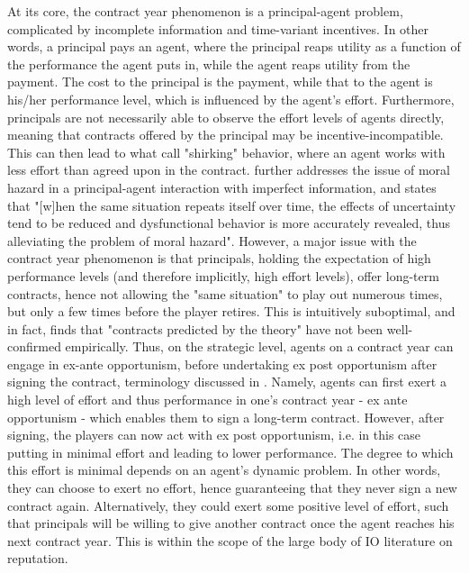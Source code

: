 \documentclass[12pt]{article}
\begin{document}
	At its core, the contract year phenomenon is a principal-agent problem, complicated by incomplete information and time-variant incentives. In other words, a principal pays an agent, where the principal reaps utility as a function of the performance the agent puts in, while the agent reaps utility from the payment. The cost to the principal is the payment, while that to the agent is his/her performance level, which is influenced by the agent's effort. Furthermore, principals are not necessarily able to observe the effort levels of agents directly, meaning that contracts offered by the principal may be incentive-incompatible. This can then lead to what \cite{alchian_1972} call "shirking" behavior, where an agent works with less effort than agreed upon in the contract. \cite{holmstrom_contracts_1999} further addresses the issue of moral hazard in a principal-agent interaction with imperfect information, and states that "[w]hen the same situation repeats itself over time, the effects of uncertainty tend to be reduced and dysfunctional behavior is more accurately revealed, thus alleviating the problem of moral hazard". However, a major issue with the contract year phenomenon is that principals, holding the expectation of high performance levels (and therefore implicitly, high effort levels), offer long-term contracts, hence not allowing the "same situation" to play out numerous times, but only a few times before the player retires. This is intuitively suboptimal, and in fact, \cite{prendergast_1999} finds that "contracts predicted by the theory" have not been well-confirmed empirically. Thus, on the strategic level, agents on a contract year can engage in ex-ante opportunism, before undertaking ex post opportunism after signing the contract, terminology discussed in \cite{ress_1994}. Namely, agents can first exert a high level of effort and thus performance in one's contract year - ex ante opportunism - which enables them to sign a long-term contract. However, after signing, the players can now act with ex post opportunism, i.e. in this case putting in minimal effort and leading to lower performance. The degree to which this effort is minimal depends on an agent's dynamic problem. In other words, they can choose to exert no effort, hence guaranteeing that they never sign a new contract again. Alternatively, they could exert some positive level of effort, such that principals will be willing to give another contract once the agent reaches his next contract year. This is within the scope of the large body of IO literature on reputation.
	
\end{document}
